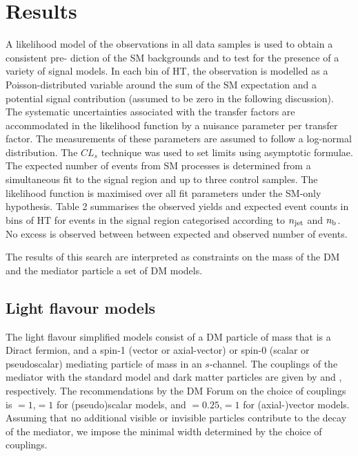 \section{Results} \label{sec:darkmatter}
\clearpage
A likelihood model of the observations in all data samples is used to obtain a consistent pre-
diction of the SM backgrounds and to test for the presence of a variety of signal models.
In each bin of HT, the observation is modelled as a Poisson-distributed variable around the sum
of the SM expectation and a potential signal contribution (assumed to be zero in the following
discussion).  The systematic uncertainties associated with the transfer factors are accommodated 
in the likelihood function by a nuisance parameter per transfer factor. 
The measurements of these parameters are assumed to follow a log-normal
distribution. The $CL_s$ technique was used to set limits using asymptotic formulae.
The expected number of events from SM processes is determined from a simultaneous fit to
the signal region and up to three control samples. The likelihood function is maximised over
all fit parameters under the SM-only hypothesis. Table 2 summarises the observed yields and
expected event counts in bins of HT for events in the signal region categorised according to $n_{\rm jet}$ 
 and $n_{\rm b}$. No excess is observed between between expected and observed number of events.

The results of this search are interpreted as constraints on the mass of the DM and the mediator particle 
a set of DM models.


\subsection{Light flavour models} \label{sec:dm_lightjet}

The light flavour simplified models consist of a DM particle \pchi of mass \mchi that is a Diract fermion, and a spin-1 (vector or axial-vector) or spin-0
(scalar or pseudoscalar) mediating particle \pphi of mass \mphi in an $s$-channel. The couplings of the mediator with the standard model and dark
matter particles are given by \gsm and \gdm, respectively. The recommendations by the DM Forum on the choice of couplings is \gsm$=1$,\gdm$=1$ for
(pseudo)scalar models, and \gsm$=0.25$,\gdm$=1$ for (axial-)vector models. Assuming that no additional visible or invisible particles contribute to the decay 
of the mediator, we impose the minimal width determined by the choice of couplings.  





